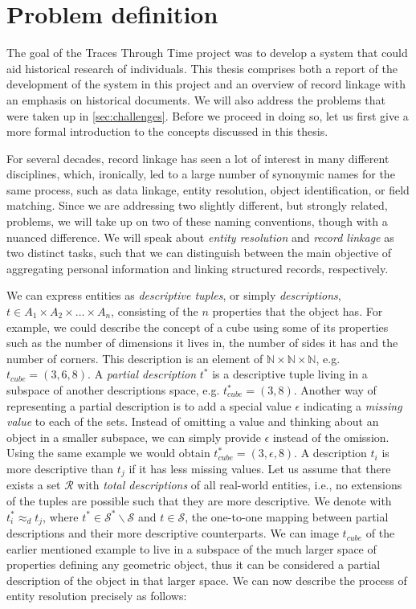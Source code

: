 \section{Problem definition}
\label{sec:problem_definition}
The goal of the Traces Through Time project was to develop a system that could aid historical research of individuals.
This thesis comprises both a report of the development of the system in this project and an overview of record linkage with an emphasis on historical documents.
We will also address the problems that were taken up in \cref{sec:challenges}.
Before we proceed in doing so, let us first give a more formal introduction to the concepts discussed in this thesis.

For several decades, record linkage has seen a lot of interest in many different disciplines, which, ironically, led to a large number of synonymic names for the same process, such as data linkage, entity resolution, object identification, or field matching. \cite{christen12}
Since we are addressing two slightly different, but strongly related, problems, we will take up on two of these naming conventions, though with a nuanced difference.
We will speak about \emph{entity resolution} and \emph{record linkage} as two distinct tasks, such that we can distinguish between the main objective of aggregating personal information and linking structured records, respectively.

We can express entities as \emph{descriptive tuples}, or simply \emph{descriptions}, $t \in A_{1} \times A_{2} \times \dots \times A_{n}$, consisting of the $n$ properties that the object has.
For example, we could describe the concept of a cube using some of its properties such as the number of dimensions it lives in, the number of sides it has and the number of corners.
This description is an element of $\mathbb{N} \times \mathbb{N} \times \mathbb{N}$, e.g. $t_{cube}=(3, 6, 8)$.
A \emph{partial description} $t^{*}$ is a descriptive tuple living in a subspace of another descriptions space, e.g. $t_{cube}^{*}=(3, 8)$.
Another way of representing a partial description is to add a special value $\epsilon$ indicating a \emph{missing value} to each of the sets.
Instead of omitting a value and thinking about an object in a smaller subspace, we can simply provide $\epsilon$ instead of the omission.
Using the same example we would obtain $t_{cube}^{*}=(3, \epsilon, 8)$.
A description $t_i$ is more descriptive than $t_j$ if it has less missing values.
Let us assume that there exists a set $\mathcal{R}$ with \emph{total descriptions} of all real-world entities, i.e., no extensions of the tuples are possible such that they are more descriptive.
We denote with $t_{i}^{*} \approx_{d} t_{j}$, where $t^{*} \in \mathcal{S}^{*} \backslash \mathcal{S}$ and $t \in \mathcal{S}$, the one-to-one mapping between partial descriptions and their more descriptive counterparts.
We can image $t_{cube}$ of the earlier mentioned example to live in a subspace of the much larger space of properties defining any geometric object, thus it can be considered a partial description of the object in that larger space.
We can now describe the process of entity resolution precisely as follows:

